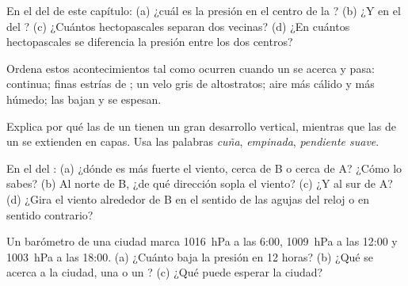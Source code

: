 \begin{exercise}[$\star$]\label{exo:g8:fronts-and-weather-maps:4}
En el  del  de este capítulo: (a) ¿cuál es la presión en el
centro de la ? (b) ¿Y en el del ? (c) ¿Cuántos
hectopascales separan dos  vecinas? (d) ¿En cuántos hectopascales
se diferencia la presión entre los dos centros?
\end{exercise}

\begin{exercise}[$\star\star$]\label{exo:g8:fronts-and-weather-maps:5}
Ordena estos acontecimientos tal como ocurren cuando un  se
acerca y pasa:  continua; finas estrías de ; un velo gris de
altostratos; aire más cálido y más húmedo; las  bajan y se espesan.
\end{exercise}

\begin{exercise}[$\star\star$]\label{exo:g8:fronts-and-weather-maps:6}
Explica por qué las  de un  tienen un gran desarrollo
vertical, mientras que las de un  se extienden en capas. Usa
las palabras \emph{cuña}, \emph{empinada}, \emph{pendiente suave}.
\end{exercise}

\begin{exercise}[$\star\star$]\label{exo:g8:fronts-and-weather-maps:7}
En el  del : (a) ¿dónde es más fuerte el viento, cerca de B o
cerca de A? ¿Cómo lo sabes? (b) Al norte de B, ¿de qué dirección sopla el
viento? (c) ¿Y al sur de A? (d) ¿Gira el viento alrededor de B en el
sentido de las agujas del reloj o en sentido contrario?
\end{exercise}

\begin{exercise}[$\star\star$]\label{exo:g8:fronts-and-weather-maps:8}
Un barómetro de una ciudad marca \qty{1016}{hPa} a las 6:00,
\qty{1009}{hPa} a las 12:00 y \qty{1003}{hPa} a las 18:00. (a) ¿Cuánto
baja la presión en 12 horas? (b) ¿Qué se acerca a la ciudad, una  o
un ? (c) ¿Qué  puede esperar la ciudad?
\end{exercise}


